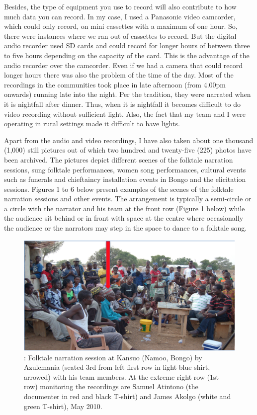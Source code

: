 \documentclass[output=paper,colorlinks,citecolor=brown]{langscibook}
\begin{document}
Besides, the type of equipment you use to record will also contribute to how much data you can record.  In my case, I used a Panasonic video camcorder, which could only record, on mini cassettes with a maximum of one hour. So, there were instances where we ran out of cassettes to record. But the digital audio recorder used SD cards and could record for longer hours of between three to five hours depending on the capacity of the card.  This is the advantage of the audio recorder over the camcorder. Even if we had a camera that could record longer hours there was also the problem of the time of the day. Most of the recordings in the communities took place in  late afternoon (from 4.00pm onwards) running late into the night. Per the tradition, they were narrated when it is nightfall after dinner. Thus, when it is nightfall it becomes difficult to do video recording without sufficient light. Also, the fact that my team and I were operating in rural settings made it difficult to have lights.

Apart from the audio and video recordings, I have also taken about one thousand (1,000) still pictures out of which two hundred and twenty-five (225) photos have been archived. The pictures depict different scenes of the folktale narration sessions, sung folktale performances, women song performances, cultural events such as funerals and chieftaincy installation events in Bongo and the elicitation sessions. Figures 1 to 6 below present examples of the scenes of the folktale narration sessions and other events. The arrangement is typically a semi-circle or a circle with the narrator and his team at the front row (Figure 1 below) while the audience sit behind or in front with space at the centre where occasionally the audience or the narrators may step in the space to dance to a folktale song.

\begin{figure}
\includegraphics[width=\textwidth]{figures/azulemania.png}
\caption{: Folktale narration session at Kansuo (Namoo, Bongo) by Azulemania (seated 3rd from left first row 
 	 in light blue shirt, arrowed) with his team members. At the extreme right row (1st row) monitoring 
 	the recordings are Samuel Atintono (the documenter in red and black T-shirt) and James Akolgo 
 	(white and green T-shirt), May 2010.}

\end{figure}
\end{document}
